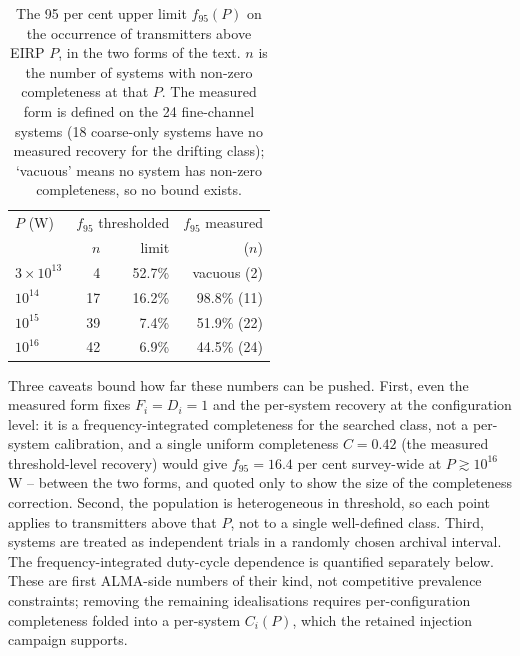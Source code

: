\documentclass{openjournal}
\begin{document}
\begin{table}
\centering
\small
\setlength{\tabcolsep}{4pt}
\caption{The 95 per cent upper limit $f_{95}(P)$ on the occurrence of
transmitters above EIRP $P$, in the two forms of the text. $n$ is the
number of systems with non-zero completeness at that $P$. The
measured form is defined on the 24 fine-channel systems (18
coarse-only systems have no measured recovery for the drifting
class); `vacuous' means no system has non-zero completeness, so no
bound exists.}
\label{tab:occurrence}
\begin{tabular}{@{}lrrr@{}}
\toprule
$P$ (W) & \multicolumn{2}{c}{$f_{95}$ thresholded} & $f_{95}$ measured \\
 & $n$ & limit & ($n$) \\
\midrule
$3\times10^{13}$ & 4 & 52.7\% & vacuous (2) \\
$10^{14}$ & 17 & 16.2\% & 98.8\% (11) \\
$10^{15}$ & 39 & 7.4\% & 51.9\% (22) \\
$10^{16}$ & 42 & 6.9\% & 44.5\% (24) \\
\bottomrule
\end{tabular}
\end{table}

Three caveats bound how far these numbers can be pushed. First, even
the measured form fixes $F_i=D_i=1$ and the per-system recovery at the
configuration level: it is a frequency-integrated completeness for the
searched class, not a per-system calibration, and a single uniform
completeness $C=0.42$ (the measured threshold-level recovery) would
give $f_{95}=16.4$ per cent survey-wide at $P\gtrsim10^{16}$\,W --
between the two forms, and quoted only to show the size of the
completeness correction. Second, the population is heterogeneous in
threshold, so each point applies to transmitters above that $P$, not
to a single well-defined class. Third, systems are treated as
independent trials in a randomly chosen archival interval. The
frequency-integrated duty-cycle dependence is quantified separately
below. These are first ALMA-side numbers of their kind, not
competitive prevalence constraints; removing the remaining
idealisations requires per-configuration completeness folded into a
per-system $C_i(P)$, which the retained injection campaign supports.
\end{document}
